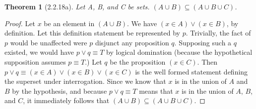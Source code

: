 \documentclass[a4paper, 12pt]{article}
\theoremstyle{plain}
\newtheorem*{theorem*}{Theorem}
\begin{document}
	
	\begin{theorem*}[2.2.18a]
		Let A, B, and C be sets. $(A \cup B) \subseteq (A \cup B \cup C)$.
	\end{theorem*}
	
	\begin{proof}
		Let $x$ be an element in $(A \cup B)$. We have $(x \in A) \lor (x \in B)$, by definition. Let this definition statement be represented by $p$. Trivially, the fact of $p$ would be unaffected were $p$ disjunct any proposition $q$. Supposing such a $q$ existed, we would have $p \lor q \equiv T$ by logical domination (because the hypothetical supposition assumes $p \equiv T$.) Let $q$ be the proposition $(x \in C)$. Then $p \lor q \equiv (x \in A) \lor (x \in B) \lor (x \in C)$ is the well formed statement defining the superset under interrogation. Since we know that $x$ is in the union of $A$ and $B$ by the hypothesis, and because $p \lor q \equiv T$ means that $x$ is in the union of $A$, $B$, and $C$, it immediately follows that \newline $(A \cup B) \subseteq (A \cup B \cup C)$.
	\end{proof}
\end{document}

